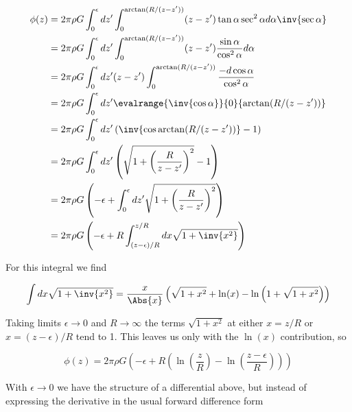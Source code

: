 \begin{align*}
\phi(z) 
&= 
2 \pi \rho G \int_0^\epsilon dz' \int_0^{\arctan(R/(z-z'))} (z - z') \tan \alpha \sec^2 \alpha d\alpha \inv{ \sec\alpha} \\
&= 
2 \pi \rho G \int_0^\epsilon dz' \int_0^{\arctan(R/(z-z'))} (z - z') \frac{\sin \alpha}{\cos^2\alpha} d\alpha \\
&= 
2 \pi \rho G \int_0^\epsilon dz' (z - z')\int_0^{\arctan(R/(z-z'))} \frac{-d\cos \alpha}{\cos^2\alpha} \\
&= 
2 \pi \rho G \int_0^\epsilon dz' \evalrange{\inv{\cos\alpha}}{0}{\arctan(R/(z-z'))} \\
&= 
2 \pi \rho G \int_0^\epsilon dz' \left( \inv{\cos\arctan(R/(z-z'))} -1 \right) \\
&= 
2 \pi \rho G \int_0^\epsilon dz' \left( \sqrt{1 + \left(\frac{R}{z-z'}\right)^2} -1 \right) \\
&=
2 \pi \rho G 
\left( -\epsilon +
\int_0^\epsilon dz' 
\sqrt{1 + \left(\frac{R}{z-z'}\right)^2} \right)  \\
&=
2 \pi \rho G 
\left( -\epsilon + R
\int_{(z - \epsilon)/R}^{z/R} dx
\sqrt{1 + \inv{x^2}}
\right)
\end{align*}

For this integral we find

\begin{equation}\label{eqn:infiniteSheetPotentials:270}
\int dx \sqrt{1 + \inv{x^2}} 
=
\frac{x}{\Abs{x}}
\left(\sqrt{1+x^2}+\ln(x)-\ln\left(1+\sqrt{1+x^2}\right)\right)
\end{equation}

Taking limits $\epsilon \rightarrow 0$ and $R \rightarrow \infty$ the terms
$\sqrt{1 + x^2}$ at either $x = z/R$ or $x = (z-\epsilon)/R$ tend to 1.  This leaves us only with the $\ln(x)$ contribution, so

\begin{equation}\label{eqn:infiniteSheetPotentials:290}
\phi(z) =
2 \pi \rho G 
\left( -\epsilon + R \left( 
\ln\left(\frac{z}{R}\right) -\ln\left(\frac{z - \epsilon}{R}\right) \right)\right)
\end{equation}

With $\epsilon \rightarrow 0$ we have the structure of a differential above, but instead of expressing the derivative in the usual forward difference form

